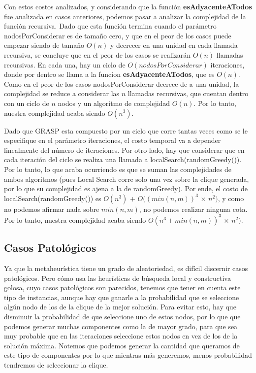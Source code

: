 Con estos costos analizados, y considerando que la función \textbf{esAdyacenteATodos} fue analizada en casos anteriores, podemos pasar a analizar la complejidad de la función recursiva. Dado que esta función termina cuando el parámetro nodosPorConsiderar es de tamaño cero, y que en el peor de los casos puede empezar siendo de tamaño $O(n)$ y decrecer en una unidad en cada llamada recursiva, se concluye que en el peor de los casos se realizarán $O(n)$ llamadas recursivas. En cada una, hay un ciclo de $O(nodosPorConsiderar)$ iteraciones, donde por dentro se llama a la funcion \textbf{esAdyacenteATodos}, que es $O(n)$. Como en el peor de los casos nodosPorConsiderar decrece de a una unidad, la complejidad se reduce a considerar las $n$ llamadas recursivas, que cuentan dentro con un ciclo de $n$ nodos y un algoritmo de complejidad $O(n)$. Por lo tanto, nuestra complejidad acaba siendo $O(n^3)$.

Dado que GRASP esta compuesto por un ciclo que corre tantas veces como se le especifique en el parámetro iteraciones, el costo temporal va a depender linealmente del número de iteraciones. Por otro lado, hay que considerar que en cada iteración del ciclo se realiza una llamada a localSearch(randomGreedy()). Por lo tanto, lo que acaba ocurriendo es que se suman las complejidades de ambos algoritmos (pues Local Search corre solo una vez sobre la clique generada, por lo que su complejidad es ajena a la de randomGreedy). Por ende, el costo de localSearch(randomGreedy()) es $O(n^3)$ + $O((min(n,m))^3$ $\times$ $n^2)$, y como no podemos afirmar nada sobre $min(n,m)$, no podemos realizar ninguna cota. Por lo tanto, nuestra complejidad acaba siendo $O(n^3 + min(n,m))^3$ $\times$ $n^2)$.

\subsection{Casos Patológicos}

Ya que la metaheurística tiene un grado de aleatoriedad, es difícil discernir casos patológicos. Pero cómo usa las heurísticas de búsqueda local y constructiva golosa, cuyo casos patológicos son parecidos, tenemos que tener en cuenta este tipo de instancias, aunque hay que ganarle a la probabilidad que se seleccione algún nodo de los de la clique de la mejor solución. Para evitar esto, hay que disminuir la probabilidad de que seleccione uno de estos nodos, por lo que que podemos generar muchas componentes como la de mayor grado, para que sea muy probable que en las iteraciones seleccione estos nodos en vez de los de la solución máxima. Notemos que podemos generar la cantidad que queramos de este tipo de componentes por lo que mientras más generemos, menos probabilidad tendremos de seleccionar la clique.

